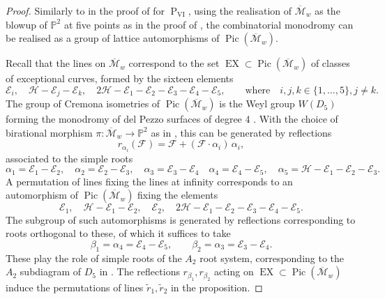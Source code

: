 \documentclass[a4paper,reqno]{amsart}
\numberwithin{equation}{section}
\newcommand{\p}{\mathbb{P}}
\newcommand{\E}{\mathcal{E}}
\newcommand{\F}{\mathcal{F}}
\newcommand{\pain}[1]{\operatorname{P}_{\mathrm{#1}}}
\newcommand{\Pic}{\operatorname{Pic}}
\numberwithin{equation}{section}
\begin{document}
\begin{proof}
        Similarly to in the proof of  for $\pain{VI}$, using the realisation of $\overline{\mathcal{M}}_w$ as the blowup of $\p^2$ at five points as in the proof of , the combinatorial monodromy can be realised as a group of lattice automorphisms of $\Pic(\overline{\mathcal{M}}_w)$.
        
        Recall that the lines on $\overline{\mathcal{M}}_w$ correspond to the set $\operatorname{EX}\subset\Pic(\overline{\mathcal{M}}_w)$ of classes of exceptional curves, formed by the sixteen elements 
        $$\mathcal{E}_i,\quad \mathcal{H}-\mathcal{E}_j-\mathcal{E}_k, \quad 2 \mathcal{H}-\E_1-\E_2-\E_3-\E_4-\mathcal{E}_5, \qquad \text{where} \quad i,j,k\in \{1,\dots,5\}, j\neq k.$$
        The group of Cremona isometries of $\Pic(\overline{\mathcal{M}}_w)$ is the Weyl group $W(D_5)$ forming the monodromy of del Pezzo surfaces of degree 4 \cites{dolgachevclassicalAG,manincubicforms}. 
        With the choice of birational morphism $\pi : \overline{\mathcal{M}}_w \to \p^2$ as in , this can be generated by reflections 
            $$r_{\alpha_i} (\F) = \F + (\F\cdot \alpha_i)\,\alpha_i,$$
        associated to the simple roots 
        $$ \alpha_1 = \mathcal{E}_1-\mathcal{E}_2, \quad \alpha_2 = \mathcal{E}_2-\mathcal{E}_3, \quad \alpha_3=\mathcal{E}_3-\mathcal{E}_4 \quad \alpha_4=\mathcal{E}_4-\mathcal{E}_5, \quad \alpha_5=\mathcal{H}-\mathcal{E}_1-\mathcal{E}_2-\mathcal{E}_3.$$
       A permutation of lines fixing the lines at infinity corresponds to an automorphism of $\Pic(\overline{\mathcal{M}}_w)$ fixing the elements 
        \begin{equation*}
        \mathcal{E}_1,\quad 
        \mathcal{H}-\mathcal{E}_1-\mathcal{E}_2,\quad 
        \mathcal{E}_2,\quad 
        2\mathcal{H}-\mathcal{E}_1- \mathcal{E}_2-\mathcal{E}_3-\mathcal{E}_4-\mathcal{E}_5.
    \end{equation*}
        The subgroup of such automorphisms is generated by reflections 
    corresponding to roots orthogonal to these, of which it suffices to take  
    $$\beta_1 = \alpha_4=\E_4-
    \E_5,\qquad \beta_2=\alpha_3 = \E_3-\E_4.$$
    These play the role of simple roots of the $A_2$ root system, corresponding to the $A_2$ subdiagram of $D_5$ in . 
    The reflections $r_{
    \beta_1},r_{\beta_2}$ acting on $\operatorname{EX} \subset \Pic(\overline{\mathcal{M}}_w)$ induce the permutations of lines $\tilde{r}_1,\tilde{r}_2$ in the proposition.
\end{proof}
\end{document}
